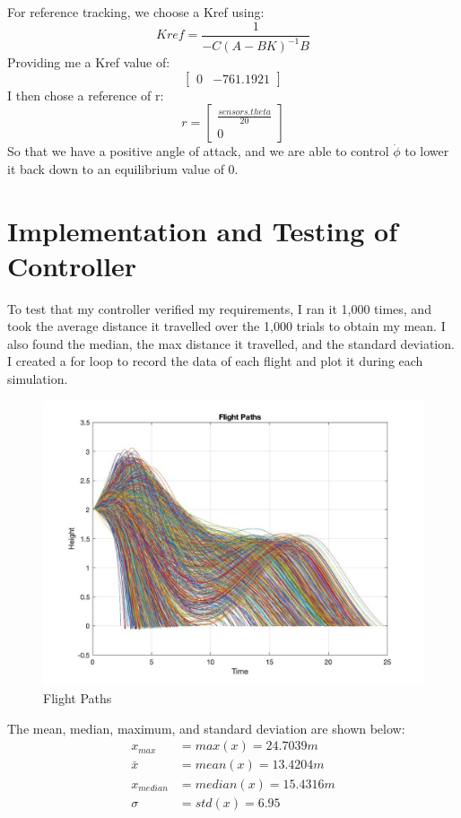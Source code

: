\documentclass[12pt]{article}
\begin{document}
For reference tracking, we choose a Kref using:
\begin{equation}
    Kref = \frac{1}{-C(A-BK)^{-1}B}
\end{equation}
Providing me a Kref value of:
\begin{equation}
    \begin{bmatrix}
    0 & -761.1921
    \end{bmatrix}
\end{equation}
I then chose a reference of r:
\begin{equation}
    r = \begin{bmatrix}
    \frac{sensors.theta}{20}\\0
    \end{bmatrix}
\end{equation}
So that we have a positive angle of attack, and we are able to control $\dot{\phi}$ to lower it back down to an equilibrium value of 0.

\section{Implementation and Testing of Controller}
To test that my controller verified my requirements, I ran it 1,000 times, and took the average distance it travelled over the 1,000 trials to obtain my mean. I also found the median, the max distance it travelled, and the standard deviation. I created a for loop to record the data of each flight and plot it during each simulation.
\begin{figure}[H]
	\centering
	\includegraphics[width=0.6\linewidth]{flight paths.jpg}
	\caption{Flight Paths}
\end{figure}
The mean, median, maximum, and standard deviation are shown below:
\begin{align*}
    x_{max} &= max(x) = 24.7039 m\\
    \bar{x} &= mean(x) = 13.4204 m\\
    x_{median} &= median(x) = 15.4316 m\\
    \sigma &= std(x) = 6.95\\
\end{align*}
\end{document}
